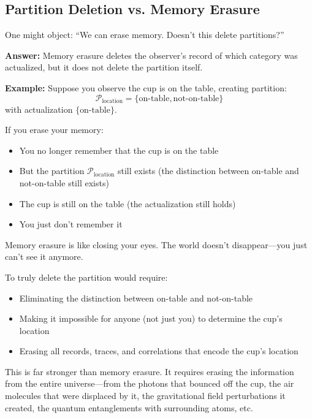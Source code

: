 \documentclass[twocolumn,10pt]{article}
\theoremstyle{definition}
\theoremstyle{remark}
\begin{document}
\subsection{Partition Deletion vs. Memory Erasure}

One might object: ``We can erase memory. Doesn't this delete partitions?''

\vspace{0.2cm}
\noindent\textbf{Answer:} Memory erasure deletes the observer's record of which category was actualized, but it does not delete the partition itself.

\vspace{0.2cm}
\noindent\textbf{Example:} Suppose you observe the cup is on the table, creating partition:
\begin{equation}
\mathcal{P}_{\text{location}} = \{\text{on-table}, \text{not-on-table}\}
\end{equation}
with actualization $\{\text{on-table}\}$.

If you erase your memory:
\begin{itemize}
\item You no longer remember that the cup is on the table
\item But the partition $\mathcal{P}_{\text{location}}$ still exists (the distinction between on-table and not-on-table still exists)
\item The cup is still on the table (the actualization still holds)
\item You just don't remember it
\end{itemize}

\noindent Memory erasure is like closing your eyes. The world doesn't disappear—you just can't see it anymore.

\vspace{0.2cm}
\noindent To truly delete the partition would require:
\begin{itemize}
\item Eliminating the distinction between on-table and not-on-table
\item Making it impossible for anyone (not just you) to determine the cup's location
\item Erasing all records, traces, and correlations that encode the cup's location
\end{itemize}

\noindent This is far stronger than memory erasure. It requires erasing the information from the entire universe—from the photons that bounced off the cup, the air molecules that were displaced by it, the gravitational field perturbations it created, the quantum entanglements with surrounding atoms, etc.
\end{document}
